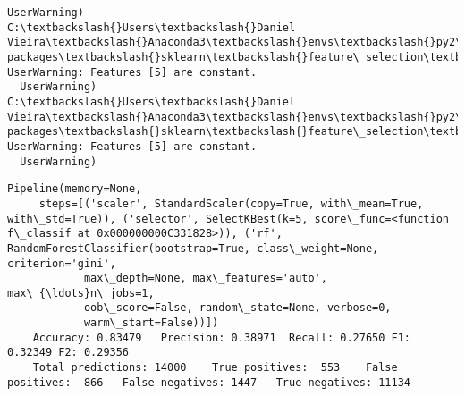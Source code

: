 \documentclass[11pt]{article}
\begin{document}
\begin{Verbatim}[commandchars=\\\{\}]
  UserWarning)
C:\textbackslash{}Users\textbackslash{}Daniel Vieira\textbackslash{}Anaconda3\textbackslash{}envs\textbackslash{}py2\textbackslash{}lib\textbackslash{}site-packages\textbackslash{}sklearn\textbackslash{}feature\_selection\textbackslash{}univariate\_selection.py:113: UserWarning: Features [5] are constant.
  UserWarning)
C:\textbackslash{}Users\textbackslash{}Daniel Vieira\textbackslash{}Anaconda3\textbackslash{}envs\textbackslash{}py2\textbackslash{}lib\textbackslash{}site-packages\textbackslash{}sklearn\textbackslash{}feature\_selection\textbackslash{}univariate\_selection.py:113: UserWarning: Features [5] are constant.
  UserWarning)

    \end{Verbatim}

    \begin{Verbatim}[commandchars=\\\{\}]
Pipeline(memory=None,
     steps=[('scaler', StandardScaler(copy=True, with\_mean=True, with\_std=True)), ('selector', SelectKBest(k=5, score\_func=<function f\_classif at 0x000000000C331828>)), ('rf', RandomForestClassifier(bootstrap=True, class\_weight=None, criterion='gini',
            max\_depth=None, max\_features='auto', max\_{\ldots}n\_jobs=1,
            oob\_score=False, random\_state=None, verbose=0,
            warm\_start=False))])
	Accuracy: 0.83479	Precision: 0.38971	Recall: 0.27650	F1: 0.32349	F2: 0.29356
	Total predictions: 14000	True positives:  553	False positives:  866	False negatives: 1447	True negatives: 11134


    \end{Verbatim}
\end{document}
